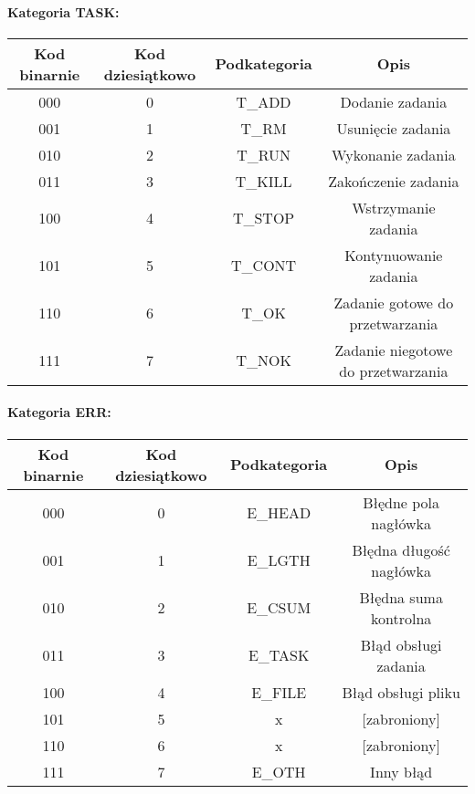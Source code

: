 \documentclass[10pt,a4paper]{article}
\begin{document}
			    \paragraph{Kategoria TASK:\\}
			    
		        \begin{tabular}{ c | c | c | c }
				    \textbf{Kod binarnie} & \textbf{Kod dziesiątkowo} & \textbf{Podkategoria} & \textbf{Opis} \\
				    \hline
				    000 & 0 & T\_ADD & Dodanie zadania \\
				    001 & 1 & T\_RM & Usunięcie zadania \\
				    010 & 2 & T\_RUN & Wykonanie zadania \\
				    011 & 3 & T\_KILL & Zakończenie zadania \\
				    100 & 4 & T\_STOP & Wstrzymanie zadania \\
				    101 & 5 & T\_CONT & Kontynuowanie zadania \\
				    110 & 6 & T\_OK & Zadanie gotowe do przetwarzania \\
				    111 & 7 & T\_NOK & Zadanie niegotowe do przetwarzania \\
				\end{tabular}
				
	
			    \paragraph{Kategoria ERR:\\}
			    
		        \begin{tabular}{ c | c | c | c }
				    \textbf{Kod binarnie} & \textbf{Kod dziesiątkowo} & \textbf{Podkategoria} & \textbf{Opis} \\
				    \hline
				    000 & 0 & E\_HEAD & Błędne pola nagłówka \\
				    001 & 1 & E\_LGTH & Błędna długość nagłówka \\
				    010 & 2 & E\_CSUM & Błędna suma kontrolna \\
				    011 & 3 & E\_TASK & Błąd obsługi zadania \\
				    100 & 4 & E\_FILE & Błąd obsługi pliku \\
				    101 & 5 & x & [zabroniony] \\
				    110 & 6 & x & [zabroniony] \\
				    111 & 7 & E\_OTH & Inny błąd \\
				\end{tabular}
				
\end{document}
